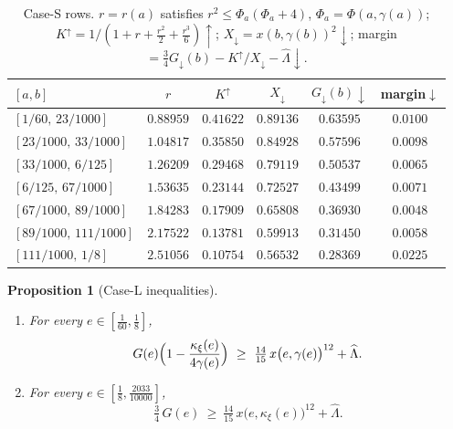 \documentclass[11pt]{article}
\newtheorem{proposition}[lemma]{Proposition}
\theoremstyle{remark}
\newcommand{\kxi}{\kappa_\xi}
\begin{document}
\begin{table}[h]\centering
\caption{Case-S rows.  $r=r(a)$ satisfies $r^2\le\Phi_a(\Phi_a+4)$,
$\Phi_a=\Phi(a,\gamma(a))$;
$K^\uparrow=1/(1{+}r{+}\tfrac{r^2}2{+}\tfrac{r^3}6)\uparrow$;
$X_\downarrow=x(b,\gamma(b))^2\downarrow$;
margin $=\tfrac34G_\downarrow(b)-K^\uparrow/X_\downarrow-\widehat\Lambda
\downarrow$.}\label{tab:caseS}
\begin{tabular}{lccccc}
\toprule
$[a,b]$ & $r$ & $K^\uparrow$ & $X_\downarrow$ & $G_\downarrow(b)\downarrow$ & margin$\downarrow$\\
\midrule
$[1/60,\,23/1000]$ & $0.88959$ & $0.41622$ & $0.89136$ & $0.63595$ & $0.0100$ \\
$[23/1000,\,33/1000]$ & $1.04817$ & $0.35850$ & $0.84928$ & $0.57596$ & $0.0098$ \\
$[33/1000,\,6/125]$ & $1.26209$ & $0.29468$ & $0.79119$ & $0.50537$ & $0.0065$ \\
$[6/125,\,67/1000]$ & $1.53635$ & $0.23144$ & $0.72527$ & $0.43499$ & $0.0071$ \\
$[67/1000,\,89/1000]$ & $1.84283$ & $0.17909$ & $0.65808$ & $0.36930$ & $0.0048$ \\
$[89/1000,\,111/1000]$ & $2.17522$ & $0.13781$ & $0.59913$ & $0.31450$ & $0.0058$ \\
$[111/1000,\,1/8]$ & $2.51056$ & $0.10754$ & $0.56532$ & $0.28369$ & $0.0225$ \\
\bottomrule
\end{tabular}
\end{table}

\begin{proposition}[Case-L inequalities]\label{prop:caseL}
\begin{enumerate}[label=\textup{(\alph*)},itemsep=1pt]
\item For every $e\in[\tfrac1{60},\tfrac18]$,
\begin{equation}\label{eq:caseLg}
        G(e)\Bigl(1-\frac{\kxi(e)}{4\gamma(e)}\Bigr)
        \ \ge\ \tfrac{14}{15}\,x\bigl(e,\gamma(e)\bigr)^{12}+\widehat\Lambda .
\end{equation}
\item For every $e\in[\tfrac18,\tfrac{2033}{10000}]$,
\begin{equation}\label{eq:caseLx}
        \tfrac34\,G(e)
        \ \ge\ \tfrac{14}{15}\,x\bigl(e,\kxi(e)\bigr)^{12}+\widehat\Lambda .
\end{equation}
\end{enumerate}
\end{proposition}
\end{document}
